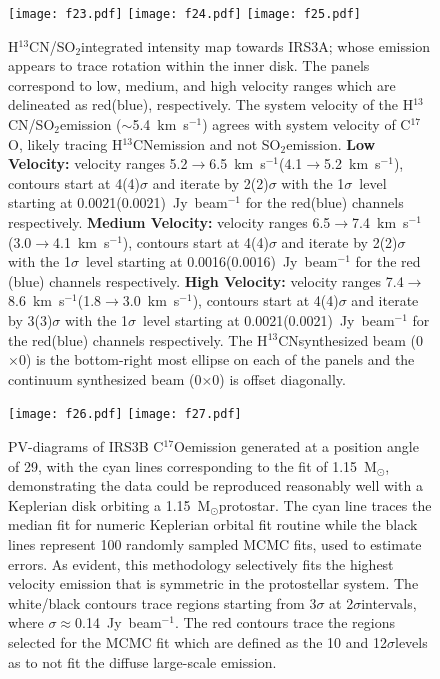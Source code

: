\documentclass[twocolumn, 12pt]{aastex63}
\newcommand{\htcn}{H$^{13}$CN}
\newcommand{\cso}{C$^{17}$O}
\newcommand{\sot}{SO$_{2}$}
\renewcommand{\deg}{\degr}
\newcommand{\ab}{$\sim$}
\newcommand{\kms}{km~s$^{-1}$}
\newcommand{\solm}{M$_{\odot}$}
\newcommand{\htcnbeam}{0\farcs22$\times$0\farcs14}
\newcommand{\contbeam}{0\farcs11$\times$0\farcs05}
\begin{document}
\begin{figure}[H]
\begin{center}
   \texttt{[image: f23.pdf]}
   \texttt{[image: f24.pdf]}
   \texttt{[image: f25.pdf]}
\end{center}
   \caption{\htcn/\sot\space integrated intensity map towards IRS3A; whose emission appears to trace rotation within the inner disk. The panels correspond to low, medium, and high velocity ranges which are delineated as red(blue), respectively. The system velocity of the \htcn/\sot\space emission (\ab5.4~km~s$^{-1}$) agrees with system velocity of \cso\space, likely tracing \htcn\space emission and not \sot\space emission. \textbf{Low Velocity:} velocity ranges 5.2$\rightarrow$6.5~\kms (4.1$\rightarrow$5.2~\kms), contours start at 4(4)$\sigma$ and iterate by 2(2)$\sigma$ with the 1$\sigma$~level starting at 0.0021(0.0021)~Jy~beam$^{-1}$ for the red(blue) channels respectively. \textbf{Medium Velocity:}  velocity ranges 6.5$\rightarrow$7.4~\kms (3.0$\rightarrow$4.1~\kms), contours start at 4(4)$\sigma$ and iterate by 2(2)$\sigma$ with the 1$\sigma$~level starting at 0.0016(0.0016)~Jy~beam$^{-1}$ for the red (blue) channels respectively. \textbf{High Velocity:} velocity ranges 7.4$\rightarrow$8.6~\kms (1.8$\rightarrow$3.0~\kms), contours start at 4(4)$\sigma$ and iterate by 3(3)$\sigma$ with the 1$\sigma$~level starting at 0.0021(0.0021)~Jy~beam$^{-1}$ for the red(blue) channels respectively. The \htcn\space synthesized beam (\htcnbeam) is the bottom-right most ellipse on each of the panels and the continuum synthesized beam (\contbeam) is offset diagonally.}\label{fig:irs3ah13cnmoment}
\end{figure}










\begin{figure}[H]
\begin{center}
\texttt{[image: f26.pdf]}
\texttt{[image: f27.pdf]}
\end{center}
\caption{PV-diagrams of IRS3B \cso\space emission generated at a position angle of 29\deg, with the cyan lines corresponding to the fit of 1.15~\solm, demonstrating the data could be reproduced reasonably well with a Keplerian disk orbiting a 1.15~\solm\space protostar. The cyan line traces the median fit for numeric Keplerian orbital fit routine while the black lines represent 100 randomly sampled MCMC fits, used to estimate errors. As evident, this methodology selectively fits the highest velocity emission that is symmetric in the protostellar system. The white/black contours trace regions starting from 3$\sigma$ at 2$\sigma$\space intervals, where $\sigma\approx$0.14~Jy~beam$^{-1}$. The red contours trace the regions selected for the MCMC fit which are defined as the 10 and 12$\sigma$\space levels as to not fit the diffuse large-scale emission.}\label{fig:l1448irs3b_c17o_pv}
\end{figure}
\end{document}
